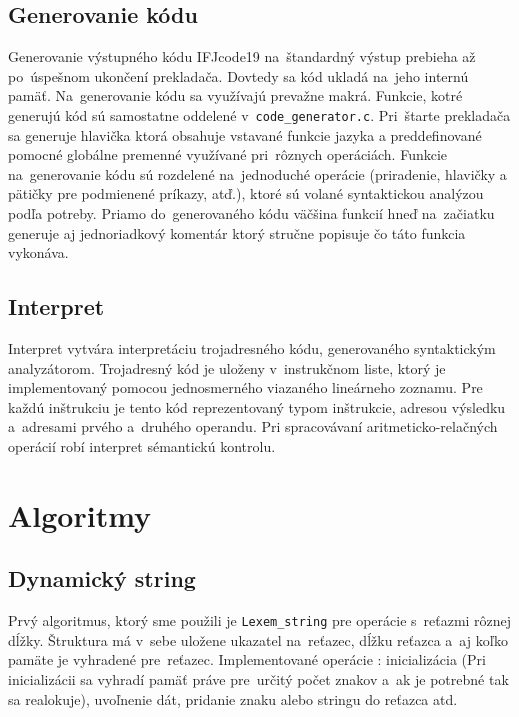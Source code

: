 \documentclass[a4paper, 11pt]{article}
\begin{document}
    \subsection{Generovanie kódu}
    
    Generovanie výstupného kódu IFJcode19 na~štandardný výstup prebieha až po~úspešnom ukončení prekladača. Dovtedy sa kód ukladá na~jeho internú pamäť. Na~generovanie kódu sa využívajú prevažne makrá. Funkcie, kotré generujú kód sú samostatne oddelené v~\texttt{code\_generator.c}. Pri~štarte prekladača sa generuje hlavička ktorá obsahuje vstavané funkcie jazyka a preddefinované pomocné globálne premenné využívané pri~rôznych operáciách. Funkcie na~generovanie kódu sú rozdelené na~jednoduché operácie (priradenie, hlavičky a pätičky pre podmienené príkazy, atď.), ktoré sú volané syntaktickou analýzou podľa potreby. Priamo do~generovaného kódu väčšina funkcií hneď na~začiatku generuje aj jednoriadkový komentár ktorý stručne popisuje čo táto funkcia vykonáva.

    \subsection{Interpret}
    
    Interpret vytvára interpretáciu trojadresného kódu, generovaného syntaktickým analyzátorom. Trojadresný kód je uloženy v~instrukčnom liste, ktorý je implementovaný pomocou jednosmerného viazaného lineárneho zoznamu. Pre každú inštrukciu je tento kód reprezentovaný typom inštrukcie, adresou výsledku a~adresami prvého a~druhého operandu. Pri spracovávaní aritmeticko-relačných operácií robí interpret sémantickú kontrolu.
    
    \pagebreak
    \section{Algoritmy}
    \subsection{Dynamický string}
    
    Prvý algoritmus, ktorý sme použili je \texttt{Lexem\_string} pre operácie s~reťazmi rôznej dĺžky. Štruktura má v~sebe uložene ukazatel na~reťazec, dĺžku reťazca a~aj koľko pamäte je vyhradené pre~reťazec. Implementované operácie : inicializácia (Pri inicializácii sa vyhradí pamäť práve pre~určitý počet znakov a~ak je potrebné tak sa realokuje), uvoľnenie dát, pridanie znaku alebo stringu do reťazca atd.
    
\end{document}
